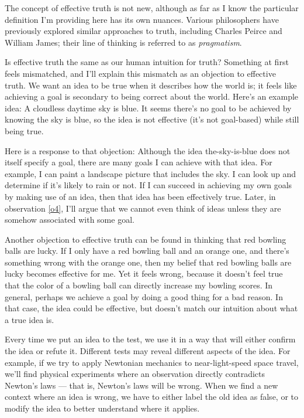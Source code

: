 \documentclass[11pt, oneside]{article}
\begin{document}
The concept of effective truth is not new, although as far as I know the
particular definition I'm providing here has its own nuances.
Various philosophers have previously
explored similar approaches to truth, including Charles Peirce and William
James; their line of thinking is referred to as {\em pragmatism}.

Is effective truth the same as our human intuition for truth?
Something at first feels mismatched, and I'll explain this mismatch as an
objection to effective truth.
We want an idea to be true when it describes how the world is;
it feels like achieving a goal is secondary to being
correct about the world.
Here's an example idea: A cloudless daytime sky is blue.
It seems there's no goal to be achieved by knowing the sky is blue,
so the idea is not effective (it's not goal-based) while
still being true.

Here is a response to that objection:
Although the idea the-sky-is-blue does not itself specify a goal, there
are many goals I can achieve with that idea. For example, I can paint a
landscape picture that includes the sky.
I can look up and determine if it's likely to rain or not.
If I can succeed in achieving my own goals by making use of an
idea, then that idea has been effectively true.
Later, in observation \ref{o4}, I'll argue that we cannot even think of ideas
unless they are somehow associated with some goal.

Another objection to effective truth can be found in thinking that red bowling
balls are lucky.
If I only have a red bowling ball and an orange one,
and there's
something wrong with the orange one, then my belief that red bowling balls are
lucky becomes effective for me.
Yet it feels wrong, because it doesn't feel true
that the color of a bowling ball can directly increase my bowling scores.
In general, perhaps we achieve a goal by doing a good thing for a bad reason.
In that case, the idea could be effective, but doesn't match our intuition about
what a true idea is.

Every time we put an idea to the test, we use it in a way that will either
confirm the idea or refute it. Different tests may reveal different aspects of
the idea. For example, if we try to apply Newtonian mechanics to
near-light-speed space travel, we'll find physical experiments where an
observation directly contradicts Newton's laws --- that is, Newton's laws will
be wrong.
When we find a new context where an idea is wrong, we have to either
label the old idea as false, or to modify the idea to
better understand where it applies.
\end{document}
